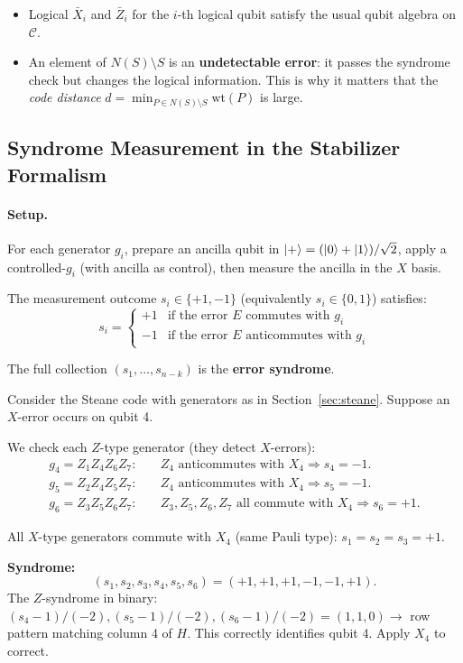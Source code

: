 \documentclass[11pt, a4paper]{article}
\theoremstyle{definition}
\theoremstyle{plain}
\theoremstyle{remark}
\begin{document}
\begin{itemize}
  \item Logical $\bar{X}_i$ and $\bar{Z}_i$ for the $i$-th logical qubit
        satisfy the usual qubit algebra on $\mathcal{C}$.
  \item An element of $N(S) \setminus S$ is an \textbf{undetectable error}:
        it passes the syndrome check but changes the logical information.
        This is why it matters that the \emph{code distance}
        $d = \min_{P \in N(S)\setminus S} \text{wt}(P)$ is large.
\end{itemize}

\subsection{Syndrome Measurement in the Stabilizer Formalism}

\paragraph{Setup.} For each generator $g_i$, prepare an ancilla qubit in
$\ket{+} = (|0\rangle + |1\rangle)/\sqrt{2}$, apply a controlled-$g_i$
(with ancilla as control), then measure the ancilla in the $X$ basis.

The measurement outcome $s_i \in \{+1, -1\}$ (equivalently $s_i \in \{0,1\}$)
satisfies:
\[
  s_i = \begin{cases}
    +1 & \text{if the error } E \text{ commutes with } g_i\\
    -1 & \text{if the error } E \text{ anticommutes with } g_i
  \end{cases}
\]

The full collection $(s_1, \dots, s_{n-k})$ is the \textbf{error syndrome}.

\begin{workedexample}
Consider the Steane code with generators as in Section~\ref{sec:steane}.
Suppose an $X$-error occurs on qubit 4.

We check each $Z$-type generator (they detect $X$-errors):
\begin{align*}
  g_4 = Z_1 Z_4 Z_6 Z_7: &\quad Z_4 \text{ anticommutes with } X_4 \Rightarrow s_4 = -1.\\
  g_5 = Z_2 Z_4 Z_5 Z_7: &\quad Z_4 \text{ anticommutes with } X_4 \Rightarrow s_5 = -1.\\
  g_6 = Z_3 Z_5 Z_6 Z_7: &\quad Z_3,Z_5,Z_6,Z_7 \text{ all commute with }
    X_4 \Rightarrow s_6 = +1.
\end{align*}

All $X$-type generators commute with $X_4$ (same Pauli type): $s_1=s_2=s_3=+1$.

\textbf{Syndrome:}
\[
(s_1, s_2, s_3, s_4, s_5, s_6) = (+1, +1, +1, -1, -1, +1).
\]
The $Z$-syndrome in binary: $(s_4-1)/(-2), (s_5-1)/(-2), (s_6-1)/(-2)
= (1, 1, 0) \to$ row pattern matching column 4 of $H$.  This
correctly identifies qubit 4.  Apply $X_4$ to correct.
\end{workedexample}
\end{document}
